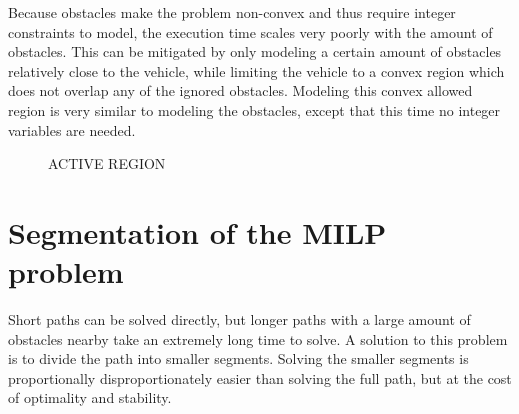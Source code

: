 \documentclass[12pt]{article}
\begin{document}
Because obstacles make the problem non-convex and thus require integer constraints to model, the execution time scales very poorly with the amount of obstacles. This can be mitigated by only modeling a certain amount of obstacles relatively close to the vehicle, while limiting the vehicle to a convex region which does not overlap any of the ignored obstacles. Modeling this convex allowed region is very similar to modeling the obstacles, except that this time no integer variables are needed.

\begin{figure}[h]
ACTIVE REGION\\
\end{figure}

\section{Segmentation of the MILP problem}
\label{section:segment}

Short paths can be solved directly, but longer paths with a large amount of obstacles nearby take an extremely long time to solve. A solution to this problem is to divide the path into smaller segments. Solving the smaller segments is proportionally disproportionately easier than solving the full path, but at the cost of optimality and stability.
\\
\end{document}
